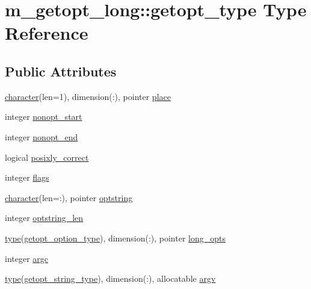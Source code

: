 \hypertarget{structm__getopt__long_1_1getopt__type}{}\section{m\+\_\+getopt\+\_\+long\+:\+:getopt\+\_\+type Type Reference}
\label{structm__getopt__long_1_1getopt__type}
\subsection*{Public Attributes}
\begin{DoxyCompactItemize}
\item 
\hyperlink{option__stopwatch_83_8txt_abd4b21fbbd175834027b5224bfe97e66}{character}(len=1), dimension(\+:), pointer \hyperlink{structm__getopt__long_1_1getopt__type_af6fd8876c9c6d9cc3fd138f82034b6b0}{place}
\item 
integer \hyperlink{structm__getopt__long_1_1getopt__type_a93269336dc54e0fda8a97ee526dec41d}{nonopt\+\_\+start}
\item 
integer \hyperlink{structm__getopt__long_1_1getopt__type_a2ef4d150aa06038a08470b7136e37b20}{nonopt\+\_\+end}
\item 
logical \hyperlink{structm__getopt__long_1_1getopt__type_a8d4f22423343ddddac8ad75e8c5e35a3}{posixly\+\_\+correct}
\item 
integer \hyperlink{structm__getopt__long_1_1getopt__type_a6fd202cf7a7c598300cce43ac7b521f7}{flags}
\item 
\hyperlink{option__stopwatch_83_8txt_abd4b21fbbd175834027b5224bfe97e66}{character}(len=\+:), pointer \hyperlink{structm__getopt__long_1_1getopt__type_a12683592006aebcc95aac78a8c399601}{optstring}
\item 
integer \hyperlink{structm__getopt__long_1_1getopt__type_a02e7f4b1bfd46652224cf691e097afcf}{optstring\+\_\+len}
\item 
\hyperlink{stop__watch_83_8txt_a70f0ead91c32e25323c03265aa302c1c}{type}(\hyperlink{structm__getopt__long_1_1getopt__option__type}{getopt\+\_\+option\+\_\+type}), dimension(\+:), pointer \hyperlink{structm__getopt__long_1_1getopt__type_a8de5191497ca7e50e4fbd7a28a306b10}{long\+\_\+opts}
\item 
integer \hyperlink{structm__getopt__long_1_1getopt__type_a91780331d8db9ac26256228dded982e8}{argc}
\item 
\hyperlink{stop__watch_83_8txt_a70f0ead91c32e25323c03265aa302c1c}{type}(\hyperlink{structm__getopt__long_1_1getopt__string__type}{getopt\+\_\+string\+\_\+type}), dimension(\+:), allocatable \hyperlink{structm__getopt__long_1_1getopt__type_a4210844e9676acb71fe72b0d684d7b67}{argv}

\end{DoxyCompactItemize}
